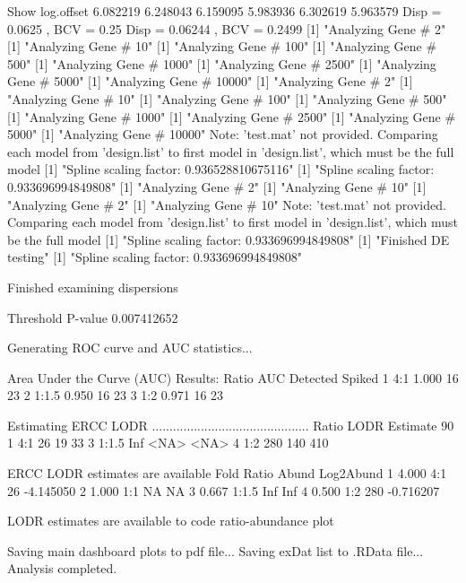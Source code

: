 \documentclass{article}
\begin{document}
\begin{Schunk}
\begin{Soutput}
Show log.offset
6.082219 6.248043 6.159095 5.983936 6.302619 5.963579 
Disp = 0.0625 , BCV = 0.25 
Disp = 0.06244 , BCV = 0.2499 
[1] "Analyzing Gene # 2"
[1] "Analyzing Gene # 10"
[1] "Analyzing Gene # 100"
[1] "Analyzing Gene # 500"
[1] "Analyzing Gene # 1000"
[1] "Analyzing Gene # 2500"
[1] "Analyzing Gene # 5000"
[1] "Analyzing Gene # 10000"
[1] "Analyzing Gene # 2"
[1] "Analyzing Gene # 10"
[1] "Analyzing Gene # 100"
[1] "Analyzing Gene # 500"
[1] "Analyzing Gene # 1000"
[1] "Analyzing Gene # 2500"
[1] "Analyzing Gene # 5000"
[1] "Analyzing Gene # 10000"
Note: 'test.mat' not provided. Comparing each model 
from 'design.list' to first model in 'design.list', which must be the full model
[1] "Spline scaling factor: 0.936528810675116"
[1] "Spline scaling factor: 0.933696994849808"
[1] "Analyzing Gene # 2"
[1] "Analyzing Gene # 10"
[1] "Analyzing Gene # 2"
[1] "Analyzing Gene # 10"
Note: 'test.mat' not provided. Comparing each model 
from 'design.list' to first model in 'design.list', which must be the full model
[1] "Spline scaling factor: 0.933696994849808"
[1] "Finished DE testing"
[1] "Spline scaling factor: 0.933696994849808"

Finished examining dispersions

Threshold P-value
0.007412652 

Generating ROC curve and AUC statistics...

Area Under the Curve (AUC) Results:
  Ratio   AUC Detected Spiked
1   4:1 1.000       16     23
2 1:1.5 0.950       16     23
3   1:2 0.971       16     23

Estimating ERCC LODR
.............................................
  Ratio LODR Estimate 90%
1   4:1            26                 19                 33
3 1:1.5           Inf               <NA>               <NA>
4   1:2           280                140                410

 ERCC LODR estimates are available
   Fold Ratio Abund Log2Abund
1 4.000   4:1    26 -4.145050
2 1.000   1:1    NA        NA
3 0.667 1:1.5   Inf       Inf
4 0.500   1:2   280 -0.716207

LODR estimates are available to code ratio-abundance plot

Saving main dashboard plots to pdf file...
Saving exDat list to .RData file...
Analysis completed.
\end{Soutput}
\end{Schunk}
\end{document}
